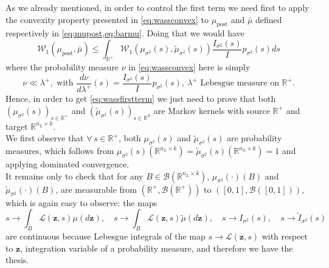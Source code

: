 \documentclass[a4paper, 11pt, reqno]{amsart}
\theoremstyle{plain}
\theoremstyle{remark}
\theoremstyle{definition}
\newcommand{\wass}[3][2]{\mathcal{W}_{#1}\left(#2, #3\right)}
\newcommand{\real}{\mathbb{R}}
\newcommand{\borel}[1]{\mathcal{B}\left(#1\right)}
\let\oldforall\forall
\renewcommand{\forall}{\oldforall\,}
\begin{document}
As we already mentioned, in order to control the first term we need first to apply the convexity property presented in \cref{eq:wassconvex} to $\mu_{\mathrm{post}}$ and $\bar{\mu}$ defined respectively in \cref{eq:mupost,eq:barmu}.
Doing that we would have
\begin{equation} \label{eq:wassfirstterm}
	\wass[1]{\mu_{\mathrm{post}}}{\bar{\mu}} \leq \int_{\real^+} \wass[1]{\mu_{\sigma^2}(s)}{\widetilde{\mu}_{\sigma^2}(s)} \frac{\mathit{I}_{\sigma^2}(s)}{\mathit{I}} p_{\sigma^2}(s) ds
\end{equation}
where the probability measure $\nu$ in \cref{eq:wassconvex} here is simply
\begin{equation*}
	\nu \ll \lambda^+, \text{ with } \frac{d\nu}{d\lambda^+}(s) = \frac{\mathit{I}_{\sigma^2}(s)}{\mathit{I}} p_{\sigma^2}(s), \ \lambda^+ \text{ Lebesgue measure on } \real^+.
\end{equation*}
Hence, in order to get \cref{eq:wassfirstterm} we just need to prove that both $(\mu_{\sigma^2}(s))_{s \in \real^+}$ and $(\widetilde{\mu}_{\sigma^2}(s))_{s \in \real^S}$ are Markov kernels with source $\real^+$ and target $\real^{n_L \times k}$. \\
We first observe that $\forall s \in \real^+$, both $\mu_{\sigma^2}(s)$ and $\widetilde{\mu}_{\sigma^2}(s)$ are probability measures, which follows from $\mu_{\sigma^2}(s)(\real^{n_L \times k}) = \widetilde{\mu}_{\sigma^2}(s)(\real^{n_L \times k}) = 1$ and applying dominated convergence. \\
It remains only to check that for any $B \in \borel{\real^{n_L \times k}}$, $\mu_{\sigma^2}(\cdot)(B)$ and $\widetilde{\mu}_{\sigma^2}(\cdot)(B)$, are measurable from $(\real^+, \borel{\real^+})$ to $([0, 1], \borel{[0, 1]})$, which is again easy to observe:  the maps
\begin{equation*}
	s \to \int_B \mathcal{L}(\bm{z}, s) \mu(d\bm{z}), \quad s \to \int_B \mathcal{L}(\bm{z}, s) \widetilde{\mu}(d\bm{z}), \quad s \to \mathit{I}_{\sigma^2}(s), \quad s \to \widetilde{\mathit{I}}_{\sigma^2}(s) 
\end{equation*}
are continuous because Lebesgue integrals of the map $s \to \mathcal{L}(\bm{z}, s)$ with respect to $\bm{z}$, integration variable of a probability measure, and therefore we have the thesis.

\smallskip
\end{document}
